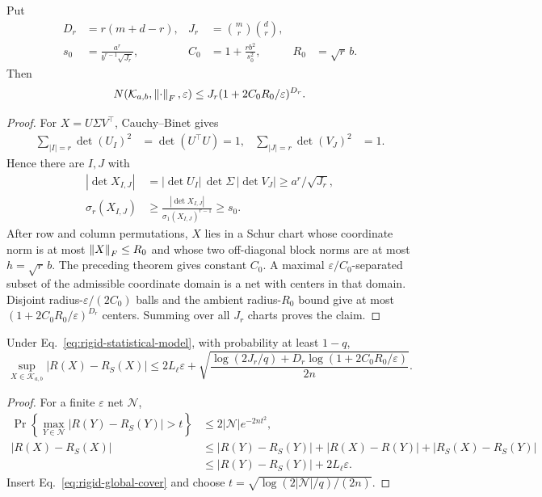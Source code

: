 \begin{theorem}
\label{thm:rigid-global-cover}
Put
\begin{align}
D_r&=r(m+d-r),&
J_r&={m\choose r}{d\choose r},\\
s_0&=\frac{a^r}{b^{r-1}\sqrt{J_r}},&
C_0&=1+\frac{rb^2}{s_0^2},&
R_0&=\sqrt r\,b .
\end{align}
Then
\begin{equation}
N(\mathcal K_{a,b},\left\lVert\cdot\right\rVert_F,\varepsilon)
\leq J_r(1+2C_0R_0/\varepsilon)^{D_r}.
\label{eq:rigid-global-cover}
\end{equation}
\end{theorem}
\begin{proof}
For $X=U\Sigma V^\top$, Cauchy--Binet gives
\begin{align}
\sum_{|I|=r}\det(U_I)^2&=\det(U^\top U)=1,&
\sum_{|J|=r}\det(V_J)^2&=1 .
\end{align}
Hence there are $I,J$ with
\begin{align}
|\det X_{I,J}|
&=|\det U_I|\,\det\Sigma\,|\det V_J|
\geq a^r/\sqrt{J_r},\\
\sigma_r(X_{I,J})
&\geq\frac{|\det X_{I,J}|}{\sigma_1(X_{I,J})^{r-1}}
\geq s_0 .
\end{align}
After row and column permutations, $X$ lies in a Schur chart whose
coordinate norm is at most $\left\lVert X\right\rVert_F\leq R_0$ and whose two off-diagonal
block norms are at most $h=\sqrt r\,b$.
The preceding theorem gives constant $C_0$.
A maximal $\varepsilon/C_0$-separated subset of the admissible
coordinate domain is a net with centers in that domain. Disjoint
radius-$\varepsilon/(2C_0)$ balls and the ambient radius-$R_0$ bound
give at most $(1+2C_0R_0/\varepsilon)^{D_r}$ centers. Summing over
all $J_r$ charts proves the claim.
\end{proof}

\begin{theorem}
\label{thm:chart-generalization}
Under Eq.~\eqref{eq:rigid-statistical-model}, with probability at least
$1-q$,
\begin{equation}
\sup_{X\in\mathcal K_{a,b}}|R(X)-R_S(X)|
\leq2L_\ell\varepsilon+
\sqrt{\frac{\log(2J_r/q)+D_r\log(1+2C_0R_0/\varepsilon)}{2n}} .
\label{eq:rigid-intrinsic-generalization}
\end{equation}
\end{theorem}
\begin{proof}
For a finite $\varepsilon$ net $\mathcal N$,
\begin{align}
\Pr\left\{\max_{Y\in\mathcal N}|R(Y)-R_S(Y)|>t\right\}
&\leq2|\mathcal N|e^{-2nt^2},\\
|R(X)-R_S(X)|
&\leq |R(Y)-R_S(Y)|+
|R(X)-R(Y)|+|R_S(X)-R_S(Y)|\\
&\leq |R(Y)-R_S(Y)|+2L_\ell\varepsilon .
\end{align}
Insert Eq.~\eqref{eq:rigid-global-cover} and choose
$t=\sqrt{\log(2|\mathcal N|/q)/(2n)}$.
\end{proof}

